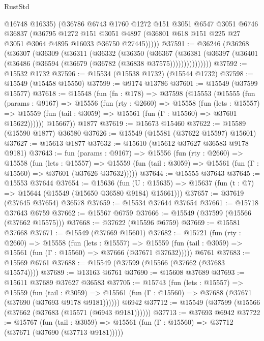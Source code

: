 \begin{lexlean}{RustStd}
\begin{coremodule}
          @16748
          @16335)
        (@36786
          @6743
          @1760
          @1272
          @151
          @3051
          @6547
          @3051
          @6746
          @36837
          (@36795
            @1272
            @151
            @3051
            @4897
            (@36801 @618 @151 @225 @27 @3051 @3064 @4895 @16033 @36750 @27445)))))
@37591 := @36246
    (@36268
      (@36307
        (@36309
          (@36311
            (@36332
              (@36350
                (@36367
                  (@36381
                    (@36397 (@36401 (@36486 (@36594 (@36679 (@36782 (@36838 @37575)))))))))))))))
@37592 := @15532 @1732
@37596 := @15534 (@15538 @1732) (@15544 @1732)
@37598 := @15549 (@15458 @15550)
@37599 := @9174 @13786
@37601 := @15549 (@37599 @15577)
@37618 := @15548
    (fun (fn : @178) =>
    @37598
      (@15553
        (@15555
          (fun (params : @9167) =>
          @15556
            (fun (rty : @2660) =>
            @15558
              (fun (lets : @15557) =>
              @15559 (fun (tail : @3059) => @15561 (fun (Γ : @15560) => @37601 @15622))))))
        @15667))
    @1877
@37619 := @15673 @15460
@37622 := @15589 (@15590 @1877) @36580
@37626 := @15549 (@15581 (@37622 @15597) @15601)
@37627 := @15613 @1877
@37632 := @15610 (@15612 @37627 @36583 @9178 @9181)
@37643 := fun (params : @9167) =>
  @15556
    (fun (rty : @2660) =>
    @15558
      (fun (lets : @15557) =>
      @15559 (fun (tail : @3059) => @15561 (fun (Γ : @15560) => @37601 (@37626 @37632)))))
@37644 := @15555 @37643
@37645 := @15553 @37644
@37654 := @15636
    (fun (U : @15635) => @15637 (fun (t : @7) => @15644 (@15549 (@15650 @36580 @9184) @15661)))
@37657 := @37619 (@37645 @37654) @36578
@37659 := @15534 @37644 @37654
@37661 := @15718 @37643 @6759
@37662 := @15567 @6759
@37666 := @15549 (@37599 (@15566 (@37662 @15575)))
@37668 := @37622 (@15596 @6759)
@37669 := @15581 @37668
@37671 := @15549 (@37669 @15601)
@37682 := @15721
    (fun (rty : @2660) =>
    @15558
      (fun (lets : @15557) =>
      @15559 (fun (tail : @3059) => @15561 (fun (Γ : @15560) => @37666 (@37671 @37632)))))
    @6761
@37683 := @15569 @6761
@37688 := @15549 (@37599 (@15566 (@37662 (@37683 @15574))))
@37689 := @13163 @6761
@37690 := @15608 @37689
@37693 := @15611 @37689 @37627 @36583
@37705 := @15743
    (fun (lets : @15557) =>
    @15559
      (fun (tail : @3059) =>
      @15561 (fun (Γ : @15560) => @37688 (@37671 (@37690 (@37693 @9178 @9181))))))
    @6942
@37712 := @15549 (@37599 (@15566 (@37662 (@37683 (@15571 (@6943 @9181))))))
@37713 := @37693 @6942
@37722 := @15767
    (fun (tail : @3059) => @15561 (fun (Γ : @15560) => @37712 (@37671 (@37690 (@37713 @9181)))))

\end{coremodule}
\end{lexlean}
